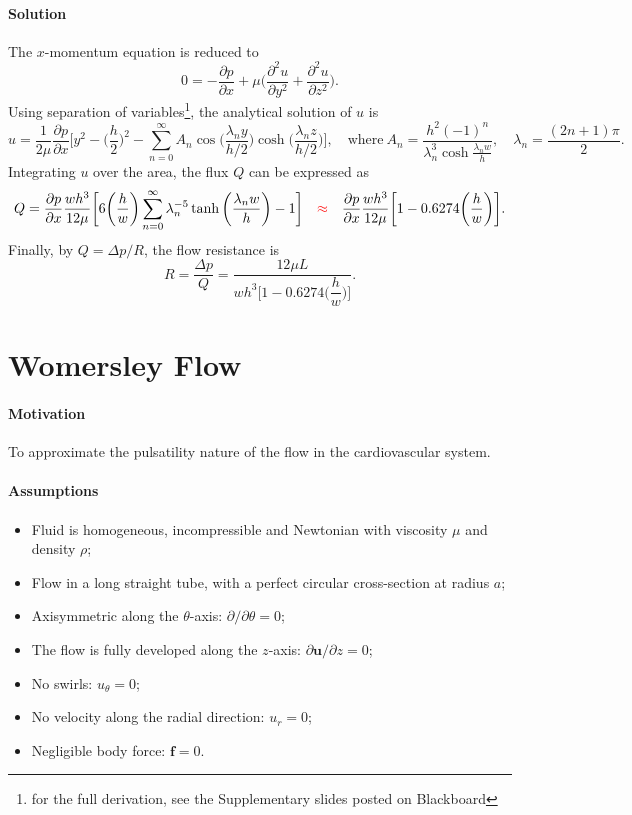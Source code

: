 \documentclass[a4paper]{article}
\begin{document}
\paragraph{Solution} The $x$-momentum equation is reduced to
\[
    0 = -\frac{\partial p}{\partial x} + \mu \bigg( \frac{\partial^2 u}{\partial y^2} + \frac{\partial^2 u}{\partial z^2} \bigg).
\]
Using separation of variables\footnote{for the full derivation, see the Supplementary slides posted on Blackboard}, the analytical solution of $u$ is
\[
    u = \frac{1}{2\mu} \frac{\partial p}{\partial x} \bigg[ y^2 - \bigg( \frac{h}{2} \bigg)^2 - \sum_{n=0}^\infty A_n \cos\bigg( \frac{\lambda_n y}{h/2} \bigg) \cosh \bigg(\frac{\lambda_n z}{h/2} \bigg) \bigg], \quad \text{where} \ A_n = \frac{h^2 (-1)^n}{\lambda_n^3 \cosh \frac{\lambda_n w}{h}}, \quad \lambda_n = \frac{(2n+1)\pi}{2}.
\]
Integrating $u$ over the area, the flux $Q$ can be expressed as
\[
    Q 
    = \frac{\partial p}{\partial x} \frac{wh^3}{12\mu} \bigg[ 6\bigg(\frac{h}{w}\bigg) \sum_{n=0}^{\infty} \lambda_n^{-5} \tanh \bigg( \frac{\lambda_n w}{h} \bigg) - 1 \bigg] 
    \quad {\color{red}\approx} \quad \frac{\partial p}{\partial x} \frac{wh^3}{12\mu} \bigg[ 1 - 0.6274 \bigg( \frac{h}{w} \bigg) \bigg].
\]
Finally, by $Q = \Delta p/R$, the flow resistance is
\[
    R = \frac{\Delta p}{Q} = \frac{12 \mu L}{wh^3 \bigg[ 1 - 0.6274 \bigg( \dfrac{h}{w} \bigg) \bigg]}.
\]

\section{Womersley Flow}
\paragraph{Motivation}  To approximate the pulsatility nature of the flow in the cardiovascular system.


\paragraph{Assumptions}
\begin{itemize}
    \item Fluid is homogeneous, incompressible and Newtonian with viscosity $\mu$ and density $\rho$;

    \item Flow in a long straight tube, with a perfect circular cross-section at radius $a$;
    
    \item Axisymmetric along the $\theta$-axis: $\partial/\partial \theta=0$; 

    \item The flow is fully developed along the $z$-axis: $\partial \mathbf{u} / \partial z=0$; 

    \item No swirls: $u_{\theta}=0$;

    \item No velocity along the radial direction: $u_r = 0$;

    \item Negligible body force: $\mathbf{f} = 0$.
\end{itemize}
\end{document}
